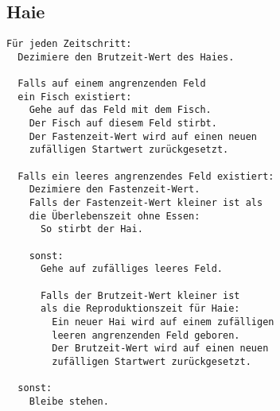 \documentclass[a4paper]{article}
\begin{document}
	\subsection{Haie}
	\begin{small}
	\begin{verbatim}
Für jeden Zeitschritt:
  Dezimiere den Brutzeit-Wert des Haies.
		
  Falls auf einem angrenzenden Feld
  ein Fisch existiert:
    Gehe auf das Feld mit dem Fisch.
    Der Fisch auf diesem Feld stirbt.
    Der Fastenzeit-Wert wird auf einen neuen
    zufälligen Startwert zurückgesetzt.
		    
  Falls ein leeres angrenzendes Feld existiert:
    Dezimiere den Fastenzeit-Wert.
    Falls der Fastenzeit-Wert kleiner ist als 
    die Überlebenszeit ohne Essen:
      So stirbt der Hai.
		        
    sonst:
      Gehe auf zufälliges leeres Feld.
		        
      Falls der Brutzeit-Wert kleiner ist
      als die Reproduktionszeit für Haie:
        Ein neuer Hai wird auf einem zufälligen
        leeren angrenzenden Feld geboren.
        Der Brutzeit-Wert wird auf einen neuen
        zufälligen Startwert zurückgesetzt.
		
  sonst:
    Bleibe stehen. 
		
	\end{verbatim}
	\end{small}
	
\end{document}
